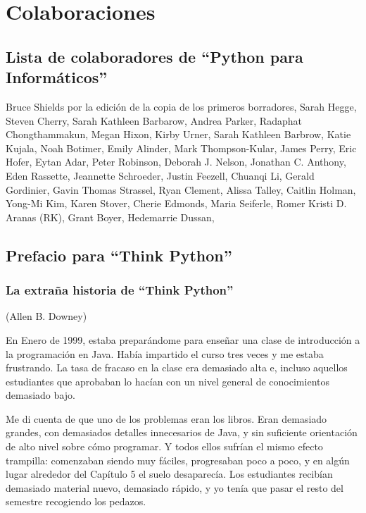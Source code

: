 
\chapter{Colaboraciones}
\section*{Lista de colaboradores de ``Python para Informáticos''}

Bruce Shields por la edición de la copia de los primeros borradores,
Sarah Hegge,
Steven Cherry,
Sarah Kathleen Barbarow,
Andrea Parker,
Radaphat Chongthammakun,
Megan Hixon,
Kirby Urner,
Sarah Kathleen Barbrow,
Katie Kujala,
Noah Botimer,
Emily Alinder,
Mark Thompson-Kular,
James Perry,
Eric Hofer,
Eytan Adar,
Peter Robinson,
Deborah J. Nelson,
Jonathan C. Anthony,
Eden Rassette,
Jeannette Schroeder,
Justin Feezell,
Chuanqi Li,
Gerald Gordinier,
Gavin Thomas Strassel,
Ryan Clement,
Alissa Talley,
Caitlin Holman,
Yong-Mi Kim,
Karen Stover,
Cherie Edmonds,
Maria Seiferle,
Romer Kristi D. Aranas (RK),
Grant Boyer,
Hedemarrie Dussan,


\section*{Prefacio para ``Think Python''}

\subsection*{La extraña historia de ``Think Python''}

(Allen B. Downey)

En Enero de 1999, estaba preparándome para enseñar una clase de introducción
a la programación en Java. Había impartido el curso tres veces y me estaba
frustrando. La tasa de fracaso en la clase era demasiado alta e, incluso
aquellos estudiantes que aprobaban lo hacían con un nivel general de conocimientos
demasiado bajo.

Me di cuenta de que uno de los problemas eran los libros.
Eran demasiado grandes, con demasiados detalles innecesarios de Java, y
sin suficiente orientación de alto nivel sobre cómo programar. Y todos ellos
sufrían el mismo efecto trampilla: comenzaban siendo muy fáciles,
progresaban poco a poco, y en algún lugar alrededor del Capítulo 5 el suelo
desaparecía. Los estudiantes recibían demasiado material nuevo, demasiado rápido,
y yo tenía que pasar el resto del semestre recogiendo los pedazos.

